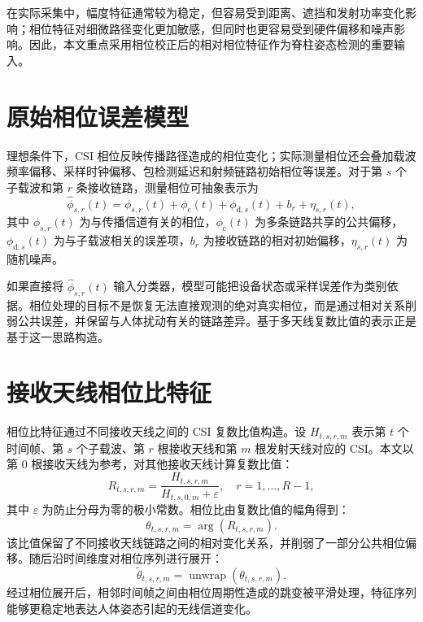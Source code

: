 在实际采集中，幅度特征通常较为稳定，但容易受到距离、遮挡和发射功率变化影响；相位特征对细微路径变化更加敏感，但同时也更容易受到硬件偏移和噪声影响。因此，本文重点采用相位校正后的相对相位特征作为脊柱姿态检测的重要输入。

\section{原始相位误差模型}
理想条件下，CSI 相位反映传播路径造成的相位变化；实际测量相位还会叠加载波频率偏移、采样时钟偏移、包检测延迟和射频链路初始相位等误差。对于第 $s$ 个子载波和第 $r$ 条接收链路，测量相位可抽象表示为
\begin{equation}
\hat{\phi}_{s,r}(t)=\phi_{s,r}(t)+\phi_{\mathrm{c}}(t)+\phi_{\mathrm{d},s}(t)+b_r+\eta_{s,r}(t),
\end{equation}
其中 $\phi_{s,r}(t)$ 为与传播信道有关的相位，$\phi_{\mathrm{c}}(t)$ 为多条链路共享的公共偏移，$\phi_{\mathrm{d},s}(t)$ 为与子载波相关的误差项，$b_r$ 为接收链路的相对初始偏移，$\eta_{s,r}(t)$ 为随机噪声。

如果直接将 $\hat{\phi}_{s,r}(t)$ 输入分类器，模型可能把设备状态或采样误差作为类别依据。相位处理的目标不是恢复无法直接观测的绝对真实相位，而是通过相对关系削弱公共误差，并保留与人体扰动有关的链路差异。基于多天线复数比值的表示正是基于这一思路构造。

\section{接收天线相位比特征}
相位比特征通过不同接收天线之间的 CSI 复数比值构造。设 $H_{t,s,r,m}$ 表示第 $t$ 个时间帧、第 $s$ 个子载波、第 $r$ 根接收天线和第 $m$ 根发射天线对应的 CSI。本文以第 0 根接收天线为参考，对其他接收天线计算复数比值：
\begin{equation}
R_{t,s,r,m}=\frac{H_{t,s,r,m}}{H_{t,s,0,m}+\varepsilon},
\quad r=1,\ldots,R-1,
\end{equation}
其中 $\varepsilon$ 为防止分母为零的极小常数。相位比由复数比值的幅角得到：
\begin{equation}
\theta_{t,s,r,m}=\arg(R_{t,s,r,m}).
\end{equation}
该比值保留了不同接收天线链路之间的相对变化关系，并削弱了一部分公共相位偏移。随后沿时间维度对相位序列进行展开：
\begin{equation}
\tilde{\theta}_{t,s,r,m}=\operatorname{unwrap}(\theta_{t,s,r,m}).
\end{equation}
经过相位展开后，相邻时间帧之间由相位周期性造成的跳变被平滑处理，特征序列能够更稳定地表达人体姿态引起的无线信道变化。

